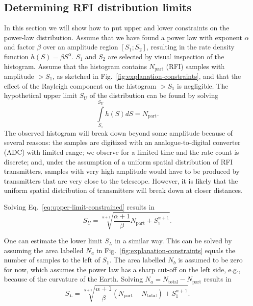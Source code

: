 \documentclass[useAMS,usenatbib]{mn2e}
\begin{document}
\subsection{Determining RFI distribution limits} \label{sec:rfi-distribution-constraints}
In this section we will show how to put upper and lower constraints on the power-law distribution. Assume that we have found a power law with exponent $\alpha$ and factor $\beta$ over an amplitude region $[S_1 ; S_2]$, resulting in the rate density function $h(S) = \beta S^\alpha$. $S_1$ and $S_2$ are selected by visual inspection of the histogram. Assume that the histogram contains $N_\textrm{part}$ (RFI) samples with amplitude $> S_1$, as sketched in Fig.~\ref{fig:explanation-constraints}, and that the effect of the Rayleigh component on the histogram $> S_1$ is negligible. The hypothetical upper limit $S_U$ of the distribution can be found by solving
\begin{equation} \label{eq:upper-limit-constrained}
 \int\limits_{S_1}^{S_U} h(S) dS = N_\textrm{part}.
\end{equation}
The observed histogram will break down beyond some amplitude because of several reasons: the samples are digitized with an analogue-to-digital converter (ADC) with limited range; we observe for a limited time and the rate count is discrete; and, under the assumption of a uniform spatial distribution of RFI transmitters, samples with very high amplitude would have to be produced by transmitters that are very close to the telescope. However, it is likely that the uniform spatial distribution of transmitters will break down at closer distances.

Solving Eq.~\eqref{eq:upper-limit-constrained} results in
\begin{equation} \label{eq:upper-limit}
S_U = \sqrt[\alpha+1]{\frac{\alpha+1}{\beta} N_\textrm{part} + S_1^{\alpha+1}}.
\end{equation}

One can estimate the lower limit $S_L$ in a similar way. This can be solved by assuming the area labelled $N_a$ in Fig.~\ref{fig:explanation-constraints} equals the number of samples to the left of $S_1$. The area labelled $N_b$ is assumed to be zero for now, which assumes the power law has a sharp cut-off on the left side, e.g., because of the curvature of the Earth. Solving $N_a = N_\textrm{total}-N_\textrm{part}$ results in
\begin{equation} \label{eq:lower-limit-1}
S_L = \sqrt[\alpha+1]{\frac{\alpha+1}{\beta}\left(N_\textrm{part} - N_\textrm{total} \right) + S_1^{\alpha+1}}.
\end{equation}
\end{document}
